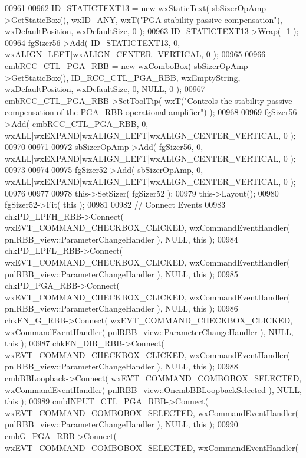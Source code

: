 \begin{DoxyCode}
00961     
00962     ID_STATICTEXT13 = \textcolor{keyword}{new} wxStaticText( sbSizerOpAmp->GetStaticBox(), wxID\_ANY, wxT(\textcolor{stringliteral}{"PGA stability passive
       compensation"}), wxDefaultPosition, wxDefaultSize, 0 );
00963     ID_STATICTEXT13->Wrap( -1 );
00964     fgSizer56->Add( ID_STATICTEXT13, 0, wxALIGN\_LEFT|wxALIGN\_CENTER\_VERTICAL, 0 );
00965     
00966     cmbRCC_CTL_PGA_RBB = \textcolor{keyword}{new} wxComboBox( sbSizerOpAmp->GetStaticBox(), 
      ID_RCC_CTL_PGA_RBB, wxEmptyString, wxDefaultPosition, wxDefaultSize, 0, NULL, 0 ); 
00967     cmbRCC_CTL_PGA_RBB->SetToolTip( wxT(\textcolor{stringliteral}{"Controls the stability passive compensation of the PGA\_RBB
       operational amplifier"}) );
00968     
00969     fgSizer56->Add( cmbRCC_CTL_PGA_RBB, 0, wxALL|wxEXPAND|wxALIGN\_LEFT|wxALIGN\_CENTER\_VERTICAL, 0 );
00970     
00971     
00972     sbSizerOpAmp->Add( fgSizer56, 0, wxALL|wxEXPAND|wxALIGN\_LEFT|wxALIGN\_CENTER\_VERTICAL, 0 );
00973     
00974     
00975     fgSizer52->Add( sbSizerOpAmp, 0, wxALL|wxEXPAND|wxALIGN\_LEFT|wxALIGN\_CENTER\_VERTICAL, 0 );
00976     
00977     
00978     this->SetSizer( fgSizer52 );
00979     this->Layout();
00980     fgSizer52->Fit( \textcolor{keyword}{this} );
00981     
00982     \textcolor{comment}{// Connect Events}
00983     chkPD_LPFH_RBB->Connect( wxEVT\_COMMAND\_CHECKBOX\_CLICKED, wxCommandEventHandler( 
      pnlRBB_view::ParameterChangeHandler ), NULL, \textcolor{keyword}{this} );
00984     chkPD_LPFL_RBB->Connect( wxEVT\_COMMAND\_CHECKBOX\_CLICKED, wxCommandEventHandler( 
      pnlRBB_view::ParameterChangeHandler ), NULL, \textcolor{keyword}{this} );
00985     chkPD_PGA_RBB->Connect( wxEVT\_COMMAND\_CHECKBOX\_CLICKED, wxCommandEventHandler( 
      pnlRBB_view::ParameterChangeHandler ), NULL, \textcolor{keyword}{this} );
00986     chkEN_G_RBB->Connect( wxEVT\_COMMAND\_CHECKBOX\_CLICKED, wxCommandEventHandler( 
      pnlRBB_view::ParameterChangeHandler ), NULL, \textcolor{keyword}{this} );
00987     chkEN_DIR_RBB->Connect( wxEVT\_COMMAND\_CHECKBOX\_CLICKED, wxCommandEventHandler( 
      pnlRBB_view::ParameterChangeHandler ), NULL, \textcolor{keyword}{this} );
00988     cmbBBLoopback->Connect( wxEVT\_COMMAND\_COMBOBOX\_SELECTED, wxCommandEventHandler( 
      pnlRBB_view::OncmbBBLoopbackSelected ), NULL, \textcolor{keyword}{this} );
00989     cmbINPUT_CTL_PGA_RBB->Connect( wxEVT\_COMMAND\_COMBOBOX\_SELECTED, wxCommandEventHandler( 
      pnlRBB_view::ParameterChangeHandler ), NULL, \textcolor{keyword}{this} );
00990     cmbG_PGA_RBB->Connect( wxEVT\_COMMAND\_COMBOBOX\_SELECTED, wxCommandEventHandler( 

\end{DoxyCode}
